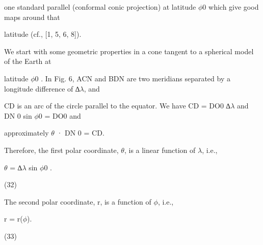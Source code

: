 \documentclass[a4paper,portrait,12pt]{article}
\begin{document}
\begin{flushleft}
one standard parallel (conformal conic projection) at latitude $\phi$0 which give good maps around that
\end{flushleft}


\begin{flushleft}
latitude (cf., [1, 5, 6, 8]).
\end{flushleft}


\begin{flushleft}
We start with some geometric properties in a cone tangent to a spherical model of the Earth at
\end{flushleft}


\begin{flushleft}
latitude $\phi$0 . In Fig. 6, ACN and BDN are two meridians separated by a longitude difference of ∆$\lambda$, and
\end{flushleft}


\begin{flushleft}
CD is an arc of the circle parallel to the equator. We have CD = DO0 ∆$\lambda$ and DN 0 sin $\phi$0 = DO0 and
\end{flushleft}


\begin{flushleft}
approximately $\theta$ · DN 0 = CD.
\end{flushleft}


\begin{flushleft}
Therefore, the first polar coordinate, $\theta$, is a linear function of $\lambda$, i.e.,
\end{flushleft}


\begin{flushleft}
$\theta$ = ∆$\lambda$ sin $\phi$0 .
\end{flushleft}





(32)





\begin{flushleft}
The second polar coordinate, r, is a function of $\phi$, i.e.,
\end{flushleft}


\begin{flushleft}
r = r($\phi$).
\end{flushleft}





(33)
\end{document}
